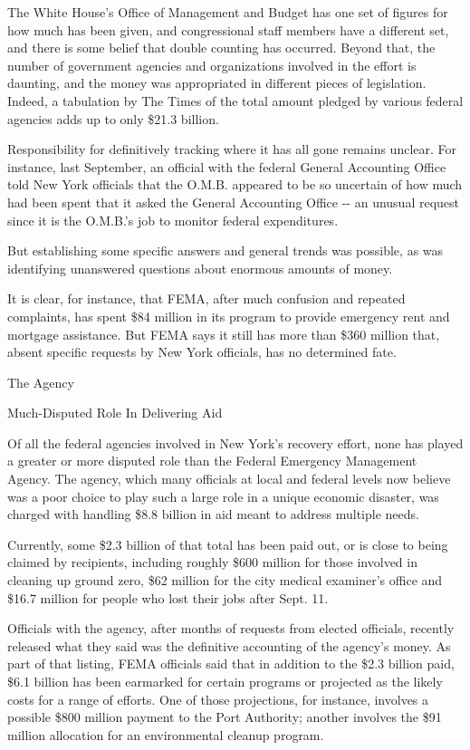The White House's Office of Management and Budget has one set of figures
for how much has been given, and congressional staff members have a
different set, and there is some belief that double counting has
occurred. Beyond that, the number of government agencies and
organizations involved in the effort is daunting, and the money was
appropriated in different pieces of legislation. Indeed, a tabulation by
The Times of the total amount pledged by various federal agencies adds
up to only \$21.3 billion.

Responsibility for definitively tracking where it has all gone remains
unclear. For instance, last September, an official with the federal
General Accounting Office told New York officials that the O.M.B.
appeared to be so uncertain of how much had been spent that it asked the
General Accounting Office -\/- an unusual request since it is the
O.M.B.'s job to monitor federal expenditures.

But establishing some specific answers and general trends was possible,
as was identifying unanswered questions about enormous amounts of money.

It is clear, for instance, that FEMA, after much confusion and repeated
complaints, has spent \$84 million in its program to provide emergency
rent and mortgage assistance. But FEMA says it still has more than \$360
million that, absent specific requests by New York officials, has no
determined fate.

The Agency

Much-Disputed Role In Delivering Aid

Of all the federal agencies involved in New York's recovery effort, none
has played a greater or more disputed role than the Federal Emergency
Management Agency. The agency, which many officials at local and federal
levels now believe was a poor choice to play such a large role in a
unique economic disaster, was charged with handling \$8.8 billion in aid
meant to address multiple needs.

Currently, some \$2.3 billion of that total has been paid out, or is
close to being claimed by recipients, including roughly \$600 million
for those involved in cleaning up ground zero, \$62 million for the city
medical examiner's office and \$16.7 million for people who lost their
jobs after Sept. 11.

Officials with the agency, after months of requests from elected
officials, recently released what they said was the definitive
accounting of the agency's money. As part of that listing, FEMA
officials said that in addition to the \$2.3 billion paid, \$6.1 billion
has been earmarked for certain programs or projected as the likely costs
for a range of efforts. One of those projections, for instance, involves
a possible \$800 million payment to the Port Authority; another involves
the \$91 million allocation for an environmental cleanup program.

